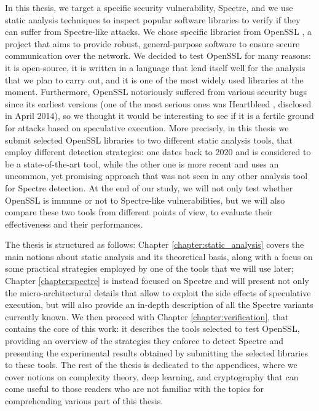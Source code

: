 \documentclass[target=mst,aauheader=aics]{thud}
\theoremstyle{definition}
\begin{document}
	\medskip
	In this thesis, we target a specific security vulnerability, Spectre, and we use static analysis techniques to inspect popular software libraries to verify if they can suffer from Spectre-like attacks. We chose specific libraries from OpenSSL \cite{OpenSSL}, a project that aims to provide robust, general-purpose software to ensure secure communication over the network. We decided to test OpenSSL for many reasons: it is open-source, it is written in a language that lend itself well for the analysis that we plan to carry out, and it is one of the most widely used libraries at the moment. Furthermore, OpenSSL notoriously suffered from various security bugs since its earliest versions (one of the most serious ones was Heartbleed \cite{Heartbleed}, disclosed in April 2014), so we thought it would be interesting to see if it is a fertile ground for attacks based on speculative execution. More precisely, in this thesis we submit selected OpenSSL libraries to two different static analysis tools, that employ different detection strategies: one dates back to 2020 and is considered to be a state-of-the-art tool, while the other one is more recent and uses an uncommon, yet promising approach that was not seen in any other analysis tool for Spectre detection. At the end of our study, we will not only test whether OpenSSL is immune or not to Spectre-like vulnerabilities, but we will also compare these two tools from different points of view, to evaluate their effectiveness and their performances.
	
	The thesis is structured as follows: Chapter \ref{chapter:static_analysis} covers the main notions about static analysis and its theoretical basis, along with a focus on some practical strategies employed by one of the tools that we will use later; Chapter \ref{chapter:spectre} is instead focused on Spectre and will present not only the micro-architectural details that allow to exploit the side effects of speculative execution, but will also provide an in-depth description of all the Spectre variants currently known. We then proceed with Chapter \ref{chapter:verification}, that contains the core of this work: it describes the tools selected to test OpenSSL, providing an overview of the strategies they enforce to detect Spectre and presenting the experimental results obtained by submitting the selected libraries to these tools. The rest of the thesis is dedicated to the appendices, where we cover notions on complexity theory, deep learning, and cryptography that can come useful to those readers who are not familiar with the topics for comprehending various part of this thesis.
	
\end{document}
